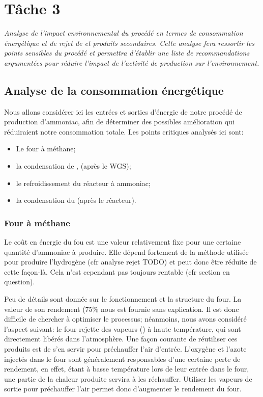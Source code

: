 \documentclass[10pt,a4paper]{report}
\begin{document}
\chapter{Tâche 3}
\textit{Analyse de l'impact environnemental du procédé en termes de consommation énergétique et de rejet de  et produits secondaires. Cette analyse fera ressortir les points sensibles du procédé et permettra d'établir une liste de recommandations argumentées pour réduire l'impact de l'activité de production sur l'environnement.}
\section{Analyse de la consommation énergétique}
Nous allons considérer ici les entrées et sorties d'énergie de notre procédé de production d'ammoniac, afin de déterminer des possibles amélioration qui réduiraient notre consommation totale. Les points critiques analysés ici sont:
\begin{itemize}
\item Le four à méthane;
\item la condensation de ,  (après le WGS);
\item le refroidissement du réacteur à ammoniac;
\item la condensation du  (après le réacteur).
\end{itemize}
\subsection{Four à méthane}
Le coût en énergie du fou est une valeur relativement fixe pour une certaine quantité d'ammoniac à produire. Elle dépend fortement de la méthode utilisée pour produire l'hydrogène (cfr analyse rejet TODO) et peut donc être réduite de cette façon-là. Cela n'est cependant pas toujours rentable (cfr section en question).

Peu de détails sont donnée sur le fonctionnement et la structure du four. La valeur de son rendement (\unit{75}{\%} nous est fournie sans explication. Il est donc difficile de chercher à optimiser le processus; néanmoins, nous avons considéré l'aspect suivant: le four rejette des vapeurs () à haute température, qui sont directement libérés dans l’atmosphère. Une façon courante de réutiliser ces produits est de s'en servir pour préchauffer l'air d'entrée. L'oxygène et l'azote injectés dans le four sont généralement responsables d'une certaine perte de rendement, en effet, étant à basse température lors de leur entrée dans le four, une partie de la chaleur produite servira à les réchauffer. Utiliser les vapeurs de sortie pour préchauffer l'air permet donc d'augmenter le rendement du four.
\end{document}
